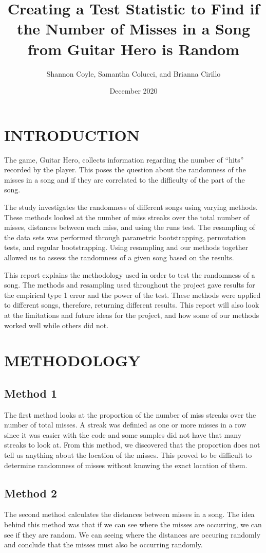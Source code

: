 \documentclass[12pt, letterpaper]{article}
\title{Creating a Test Statistic to Find if the Number of Misses in a Song from Guitar Hero is Random}
\author{Shannon Coyle, Samantha Colucci, and Brianna Cirillo}
\date{December 2020}
\begin{document}
\maketitle

\section{INTRODUCTION}
The game, Guitar Hero, collects information regarding the number of “hits” recorded by the player.  This poses the question about the randomness of the misses in a song and if they are correlated to the difficulty of the part of the song.

The study investigates the randomness of different songs using varying methods.  These methods looked at the number of miss streaks over the total number of misses, distances between each miss, and using the runs test.  The resampling of the data sets was performed through parametric bootstrapping, permutation tests, and regular bootstrapping. Using resampling and our methods together allowed us to assess the randomness of a given song based on the results. 

This report explains the methodology used in order to test the randomness of a song. The methods and resampling used throughout the project gave results for the empirical type 1 error and the power of the test. These methods were applied to different songs, therefore, returning different results. This report will also look at the limitations and future ideas for the project, and how some of our methods worked well while others did not.

\section{METHODOLOGY}
\subsection{Method 1}
The first method looks at the proportion of the number of miss streaks over the number of total misses.  A streak was definied as one or more misses in a row since it was easier with the code and some samples did not have that many streaks to look at.  From this method, we discovered that the proportion does not tell us anything about the location of the misses.  This proved to be difficult to determine randomness of misses without knowing the exact location of them.  

\subsection{Method 2}
The second method calculates the distances between misses in a song.  The idea behind this method was that if we can see where the misses are occurring, we can see if they are random.  We can seeing where the distances are occuring randomly and conclude that the misses must also be occurring randomly. 
\end{document}
